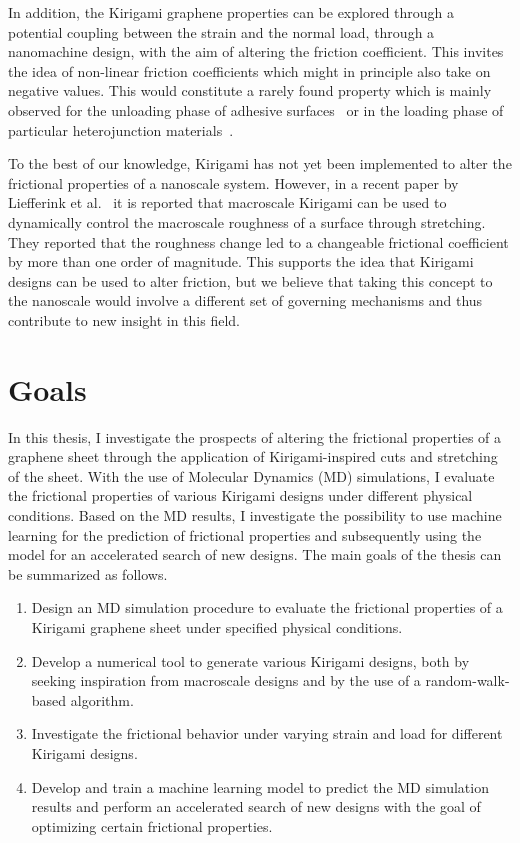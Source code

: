 In addition, the Kirigami graphene properties can be explored through a
potential coupling between the strain and the normal load, through a
nanomachine design, with the aim of altering the friction coefficient. This
invites the idea of non-linear friction coefficients which might in principle also
take on negative values. This would constitute a rarely found property which is mainly observed for the unloading phase of adhesive
surfaces~\cite{deng_adhesion-dependent_2012} or in the loading phase of particular
heterojunction materials~\cite{Liu_2020, Mandelli_2019}.

To the best of our knowledge, Kirigami has not yet been implemented to alter the
frictional properties of a nanoscale system. However, in a recent paper by
Liefferink et al.~\cite{LIEFFERINK2021101475} it is reported that macroscale
Kirigami can be used to dynamically control the macroscale roughness of a
surface through stretching. They reported that the roughness change led to a
changeable frictional coefficient by more than one order of magnitude. This
supports the idea that Kirigami designs can be used to alter friction, but we
believe that taking this concept to the nanoscale would involve a different set
of governing mechanisms and thus contribute to new insight in this field.



\section{Goals}\label{sec:goals} 
In this thesis, I investigate the prospects of
altering the frictional properties of a graphene sheet through the application
of Kirigami-inspired cuts and stretching of the sheet. With the use of Molecular
Dynamics (\acrshort{MD}) simulations, I evaluate the frictional properties of
various Kirigami designs under different physical conditions. Based on the
\acrshort{MD} results, I investigate the possibility to use machine learning
for the prediction of frictional properties and subsequently using the model for
an accelerated search of new designs. The main goals of the thesis can be
summarized as follows.
\begin{enumerate} 
    \item Design an \acrshort{MD} simulation procedure to evaluate the
    frictional properties of a Kirigami graphene sheet under specified physical
    conditions.
    \item Develop a numerical tool to generate various Kirigami designs,
    both by seeking inspiration from macroscale designs and by the use of a
    random-walk-based algorithm.
    \item Investigate the frictional behavior under varying strain and load for
    different Kirigami designs.
    \item Develop and train a machine learning model to predict the
    \acrshort{MD} simulation results and perform an accelerated search of new
    designs with the goal of optimizing certain frictional properties.
\end{enumerate}



